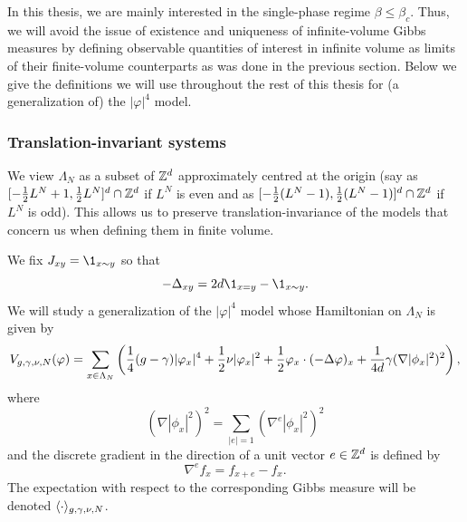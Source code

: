 In this thesis, we are mainly interested in the single-phase regime $\beta\le\beta_c$.
Thus, we will avoid the issue of
existence and uniqueness of infinite-volume Gibbs measures by defining observable
quantities of interest in infinite volume as limits
of their finite-volume counterparts as was done in the previous section.
Below we give the definitions we will use throughout the rest of this thesis for
(a generalization of) the $|\varphi|^4$ model.


\subsubsection{Translation-invariant systems}

We view $\Lambda_N$ as a subset of ${ {{\mathbb Z}}^d }$ approximately centred at the origin (say as
$[-\frac12 L^N+1,\frac12 L^N]^d \cap {\mathbb Z}^d$ if $L^N$ is even
and as $[-\frac12 (L^N-1), \frac12 (L^N-1)]^d \cap {\mathbb Z}^d$ if $L^N$ is odd). This allows us to preserve
translation-invariance of the models that concern us when defining them in finite volume.

We fix $J_{xy} = \1_{x\sim y}$ so that
\begin{equation}
-\Delta_{xy} = 2 d \1_{x = y} - \1_{x\sim y}.
\end{equation}
We will study a generalization of the $|\varphi|^4$ model whose Hamiltonian
on $\Lambda_N$ is given by
\begin{equation}
\label{e:Vdef1}
V_{g,\gamma,\nu,N}(\varphi)
	=
\sum_{x\in\Lambda_N}
\left(
	\frac{1}{4} (g - \gamma) |\varphi_x|^4
		+
	\frac{1}{2} \nu |\varphi_x|^2
		+
	\frac{1}{2} \varphi_x \cdot (-\Delta \varphi)_x
		+
	\frac{1}{4 d} \gamma (\nabla |\phi_x|^2)^2
\right),
\end{equation}
where
\begin{equation}
(\nabla |\phi_x|^2)^2
	=
\sum_{|e|=1} (\nabla^e |\phi_x|^2)^2
\end{equation}
and the discrete gradient in the direction of a unit vector $e\in{ {{\mathbb Z}}^d }$ is defined by
\begin{equation}
\nabla^e f_x = f_{x+e} - f_x.
\end{equation}
The expectation with respect to the corresponding Gibbs measure will
be denoted $\langle\cdot\rangle_{g,\gamma,\nu,N}$.

